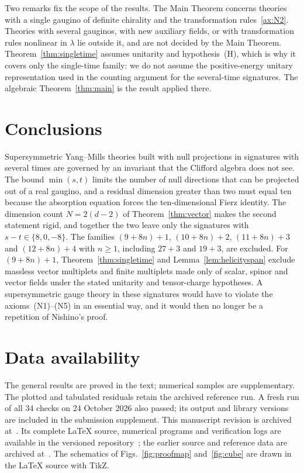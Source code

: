 Two remarks fix the scope of the results. The Main Theorem concerns theories with a single gaugino of definite chirality and the transformation rules~\ref{ax:N2}. Theories with several gauginos, with new auxiliary fields, or with transformation rules nonlinear in $\lambda$ lie outside it, and are not decided by the Main Theorem. Theorem~\ref{thm:singletime} assumes unitarity and hypothesis~(H), which is why it covers only the single-time family: we do not assume the positive-energy unitary representation used in the counting argument for the several-time signatures. The algebraic Theorem~\ref{thm:main} is the result applied there.

\section{Conclusions}
\label{sec:conclusions}

Supersymmetric Yang--Mills theories built with null projections in signatures with several times are governed by an invariant that the Clifford algebra does not see. The bound $\min(s,t)$ limits the number of null directions that can be projected out of a real gaugino, and a residual dimension greater than two must equal ten because the absorption equation forces the ten-dimensional Fierz identity. The dimension count $N=2(d-2)$ of Theorem~\ref{thm:vector} makes the second statement rigid, and together the two leave only the signatures with $s-t\in\{8,0,-8\}$. The families $(9+8n)+1$, $(10+8n)+2$, $(11+8n)+3$ and $(12+8n)+4$ with $n\ge1$, including $27+3$ and $19+3$, are excluded. For $(9+8n)+1$, Theorem~\ref{thm:singletime} and Lemma~\ref{lem:helicityspan} exclude massless vector multiplets and finite multiplets made only of scalar, spinor and vector fields under the stated unitarity and tensor-charge hypotheses. A supersymmetric gauge theory in these signatures would have to violate the axioms~(N1)--(N5) in an essential way, and it would then no longer be a repetition of Nishino's proof.

\section*{Data availability}

The general results are proved in the text; numerical samples are supplementary. The plotted and tabulated residuals retain the archived reference run. A fresh run of all 34 checks on 24 October 2026 also passed; its output and library versions are included in the submission supplement. This manuscript revision is archived at~\cite{Paper4Revision}. Its complete \LaTeX{} source, numerical programs and verification logs are available in the versioned repository~\cite{Paper4Release}; the earlier source and reference data are archived at~\cite{BhattacharjeeArchive2026}. The schematics of Figs.~\ref{fig:proofmap} and~\ref{fig:cube} are drawn in the \LaTeX{} source with TikZ.

